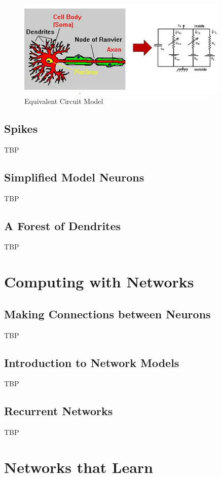 \documentclass[]{article}
\begin{document}
\begin{figure}[H]
	\caption[Equivalent Circuit Model]{Equivalent Circuit Model}
	\includegraphics[width=0.9\textwidth]{equivalent-circuit-model}
\end{figure}

\subsection{Spikes}
TBP

\subsection{Simplified Model Neurons}
TBP

\subsection{A Forest of Dendrites}
TBP

\section{Computing with Networks}\label{sec:week6}

\subsection{Making Connections between Neurons}
TBP

\subsection{Introduction to Network Models}
TBP

\subsection{Recurrent Networks}
TBP

\section{Networks that Learn}\label{sec:week7}
\end{document}
